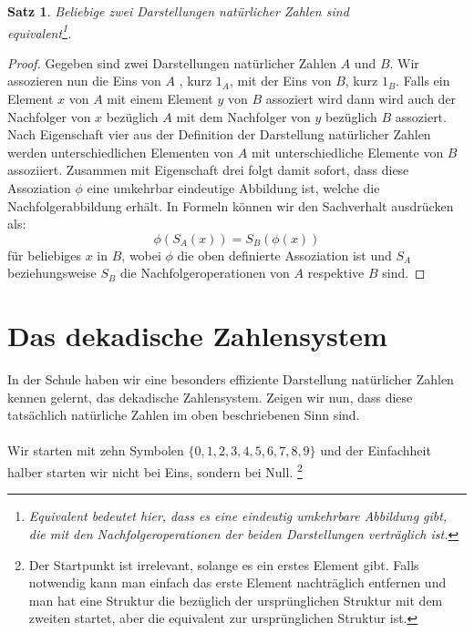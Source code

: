 \documentclass[11pt,a4paper,leqno]{report}
\newtheorem{proposition}{Satz}[chapter]
\numberwithin{equation}{chapter}
\begin{document}
\begin{proposition}
	Beliebige zwei Darstellungen nat\"urlicher Zahlen sind\\ equivalent\footnote{Equivalent bedeutet hier, dass es eine eindeutig umkehrbare Abbildung gibt, die mit den Nachfolgeroperationen der beiden Darstellungen vertr\"aglich ist.}.
\end{proposition}
\begin{proof}
	Gegeben sind zwei Darstellungen nat\"urlicher Zahlen $A$ und $B$. Wir assozieren nun die Eins von $A$ , kurz $1_A$, mit der Eins von $B$, kurz $1_B$. Falls ein Element $x$ von $A$ mit einem Element $y$ von $B$ assoziert wird dann wird auch der Nachfolger von $x$ bez\"uglich $A$ mit dem Nachfolger von $y$ bez\"uglich $B$ assoziert. 
	Nach Eigenschaft vier aus der Definition der Darstellung nat\"urlicher Zahlen werden unterschiedlichen Elementen von $A$ mit unterschiedliche Elemente von $B$ assoziiert.
	Zusammen mit Eigenschaft drei folgt damit sofort, dass diese Assoziation $\phi$ eine umkehrbar eindeutige Abbildung ist, welche die Nachfolgerabbildung erh\"alt. In Formeln k\"onnen wir den Sachverhalt ausdr\"ucken als:
	$$\phi(S_A(x)) = S_B(\phi(x))$$ f\"ur beliebiges $x$ in $B$, wobei $\phi$ die oben definierte Assoziation ist und $S_A$ beziehungsweise $S_B$ die Nachfolgeroperationen von $A$ respektive $B$ sind.
\end{proof}
\section{Das dekadische Zahlensystem}
In der Schule haben wir eine besonders effiziente Darstellung nat\"urlicher Zahlen kennen gelernt, das dekadische Zahlensystem. Zeigen wir nun, dass diese tats\"achlich nat\"urliche Zahlen im oben beschriebenen Sinn sind.\\
\\
Wir starten mit zehn Symbolen $\{0, 1, 2, 3, 4, 5, 6, 7, 8, 9\}$ und der Einfachheit halber starten wir nicht bei Eins, sondern bei Null. \footnote{Der Startpunkt ist irrelevant, solange es ein erstes Element gibt. Falls notwendig kann man einfach das erste Element nachtr\"aglich entfernen und man hat eine Struktur die bez\"uglich der urspr\"unglichen Struktur mit dem zweiten startet, aber die equivalent zur urspr\"unglichen Struktur ist.}
 
\end{document}
